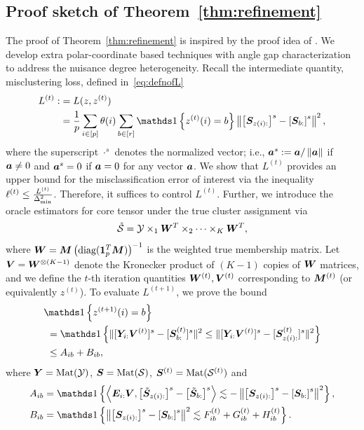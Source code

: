 \documentclass[journal]{IEEEtran}
\theoremstyle{definition}
\theoremstyle{definition}
\newcommand{\of}[1]{\left(#1\right)}
\newcommand{\off}[1]{\left[#1\right]}
\newcommand{\offf}[1]{\left\{#1\right\}}
\newcommand{\ang}[1]{\left\langle#1\right\rangle}
\begin{document}
\subsection{Proof sketch of Theorem~\ref{thm:refinement}}\label{sec:thm5}
The proof of Theorem~\ref{thm:refinement} is inspired by the proof idea of \cite[Theorem 2]{han2020exact}. We develop extra polar-coordinate based techniques with angle gap characterization to address the nuisance degree heterogeneity. Recall the intermediate quantity, misclustering loss, defined in~\eqref{eq:defnofL}
\small
\begin{align}
    L^{(t)} : &=L(z,z^{(t)})\\
    &= \frac{1}{p}  \sum_{i \in [p]} \theta(i) \sum_{b \in [r]}  \ind \offf{ z^{(t)}(i) = b } \onorm{ \off{ \mS_{ z(i):}  }^s - \off{ \mS_{b:}  }^s  }^2,
\end{align}
\normalsize
where the superscript $\cdot^{s}$ denotes the normalized vector; i.e., $\bm{a}^s:=\bm{a}/\left\lVert\bm{a}\right\rVert$ if $\bm{a}\neq 0$ and $\bm{a}^{s}=0$ if $\bm{a}=0$ for any vector $\bm{a}$. We show that $L^{(t)}$ provides an upper bound for the misclassification error of interest via the inequality $\ell^{(t)}\leq {L^{(t)}\over \Delta^2_{\min}}$. Therefore, it suffices to control $L^{(t)}$. Further, we introduce the oracle estimators for core tensor under the true cluster assignment via 
\begin{equation}
    \tilde {\mathcal{S}} = \mathcal{Y} \times_1 \bm{W}^T \times_2 \cdots \times_K \bm{W}^T, 
\end{equation}
where $\mW = \mM \of{ \text{diag}(\mone_{p}^T \mM) }^{-1}$ is the weighted true membership matrix. Let $ \bm{V} = \bm{W}^{\otimes (K-1)}$ denote the Kronecker product of $(K-1)$ copies of $\bm{W}$ matrices, and we define the $t$-th iteration quantities $\bm{W}^{(t)}, \bm{V}^{(t)}$ corresponding to $\bm M^{(t)}$ (or equivalently $z^{(t)}$). To evaluate $L^{(t+1)}$, we prove the bound
\begin{align}
    &\ind \offf{ z^{(t+1)}(i) = b } \\
    &\ = \ind \offf{       \onormSize{}{ [ \mY_{i:} \mV^{(t)}  ]^s - [\mS_{b:}^{(t)}]^s }^2 \leq \onormSize{}{ [ \mY_{i:} \mV^{(t)}  ]^s - [\mS_{z(i):}^{(t)}]^s }^2}\\
    &\ \leq A_{ib} + B_{ib}, \label{eq:proof_5_event}
\end{align}
where $\bm Y = \text{Mat}(\mathcal{Y})$, $ \bm S = \text{Mat}(\mathcal{S})$, $\bm S^{(t)} = \text{Mat}(\mathcal{S}^{(t)})$ and
\small
\begin{align}
        A_{ib} &= \ind \offf{\ang{ \mE_{i:} \mV, \off{  \tilde \mS_{z(i):} }^s - \off{  \tilde \mS_{b:} }^s } \lesssim -  \onorm{ \off{ \mS_{z(i):}  }^s - \off{ \mS_{b:}  }^s  }^2 },\\
        B_{ib} &= \ind \offf{\onorm{ \off{ \mS_{z(i):}  }^s - \off{ \mS_{b:}  }^s  }^2 \lesssim F_{ib}^{(t)} + G_{ib}^{(t)} + H_{ib}^{(t)} }.
\end{align}
\end{document}
